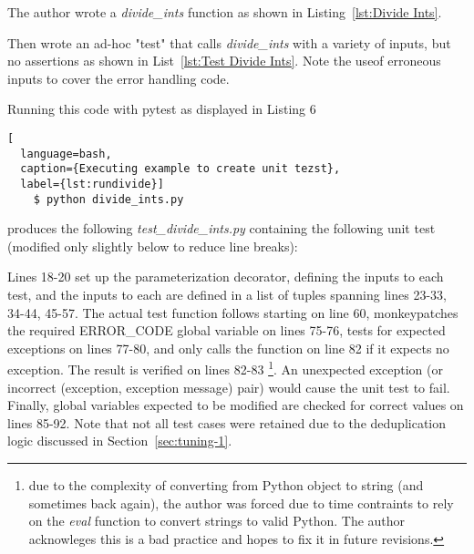 The author wrote a \textit{divide\_ints} function as shown 
in Listing~\ref{lst:Divide Ints}.



Then wrote an ad-hoc "test" that calls 
\textit{divide\_ints} with a variety of inputs, but no assertions
as shown in List~\ref{lst:Test Divide Ints}.  Note the useof erroneous inputs
to cover the error handling code.



Running this code with pytest as displayed in Listing 6%

\begin{lstlisting}[
  language=bash, 
  caption={Executing example to create unit tezst},
  label={lst:rundivide}]
    $ python divide_ints.py
\end{lstlisting}
    
produces the following \textit{test\_divide\_ints.py} containing the following 
unit test (modified only slightly below to reduce line breaks):



Lines 18-20 set up the parameterization decorator, defining the inputs to each test,
and the inputs to each are defined in a list of tuples spanning lines 23-33, 
34-44, 45-57.  The actual test function follows starting on line 60, monkeypatches
the required ERROR\_CODE global variable on lines 75-76, tests for expected 
exceptions on lines 77-80, and only calls the function on line 82 if it expects 
no exception. The result is verified on lines 82-83
\footnote{due to the complexity of converting from Python object to string
(and sometimes back again), the author was forced due to time contraints to
rely on the \textit{eval} function to convert strings to valid Python.  
The author acknowleges this is a bad practice and hopes to fix it in
future revisions.}. An unexpected exception (or incorrect 
(exception, exception message) 
pair) would cause the unit test to fail.  Finally, global variables expected to be modified 
are checked for correct values on lines 85-92.  Note that not all test cases 
were retained due to the deduplication logic discussed in Section~\ref{sec:tuning-1}.

